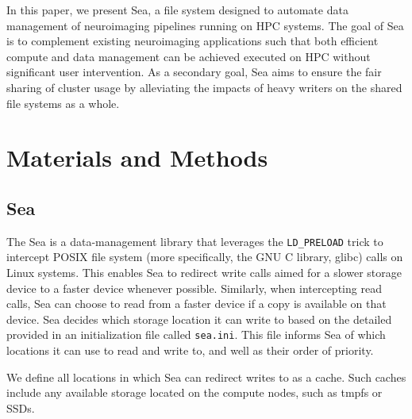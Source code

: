     In this paper, we present Sea, a file system designed to automate data
    management of neuroimaging pipelines running on HPC systems. The goal of Sea
    is to complement existing neuroimaging applications such that both efficient
    compute and data management can be achieved executed on HPC without
    significant user intervention. As a secondary goal, Sea aims to ensure the
    fair sharing of cluster usage by alleviating the impacts of heavy writers on
    the shared file systems as a whole.  
    
    
    
    
    
    
    \section{Materials and Methods}
    
    \subsection{Sea}
    
    The Sea is a data-management library that leverages the \texttt{LD\_PRELOAD}
    trick to intercept POSIX file system (more specifically, the GNU C library,
    glibc) calls on Linux systems. This enables Sea to redirect write calls
    aimed for a slower storage device to a faster device whenever possible.
    Similarly, when intercepting read calls, Sea can choose to read from a
    faster device if a copy is available on that device. Sea decides which
    storage location it can write to based on the detailed provided in an
    initialization file called \texttt{sea.ini}. This file informs Sea of which
    locations it can use to read and write to, and well as their order of
    priority.

    We define all locations in which Sea can redirect writes to as a cache. Such
    caches include any available storage located on the compute nodes, such as
    tmpfs or SSDs. 

